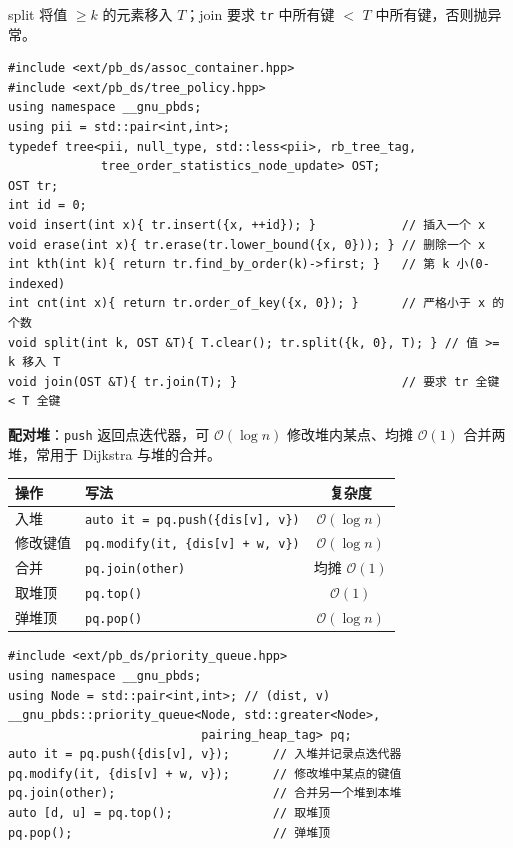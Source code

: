 split 将值 $\ge k$ 的元素移入 $T$；join 要求 \texttt{tr} 中所有键 $<$ $T$ 中所有键，否则抛异常。

\begin{lstlisting}
#include <ext/pb_ds/assoc_container.hpp>
#include <ext/pb_ds/tree_policy.hpp>
using namespace __gnu_pbds;
using pii = std::pair<int,int>;
typedef tree<pii, null_type, std::less<pii>, rb_tree_tag,
             tree_order_statistics_node_update> OST;
OST tr;
int id = 0;
void insert(int x){ tr.insert({x, ++id}); }            // 插入一个 x
void erase(int x){ tr.erase(tr.lower_bound({x, 0})); } // 删除一个 x
int kth(int k){ return tr.find_by_order(k)->first; }   // 第 k 小(0-indexed)
int cnt(int x){ return tr.order_of_key({x, 0}); }      // 严格小于 x 的个数
void split(int k, OST &T){ T.clear(); tr.split({k, 0}, T); } // 值 >= k 移入 T
void join(OST &T){ tr.join(T); }                       // 要求 tr 全键 < T 全键
\end{lstlisting}

\textbf{配对堆}：\texttt{push} 返回点迭代器，可 $\mathcal{O}(\log n)$ 修改堆内某点、均摊 $\mathcal{O}(1)$ 合并两堆，常用于 Dijkstra 与堆的合并。

\begin{center}
\small
\begin{tabular}{lp{7cm}c}
\toprule
操作 & 写法 & 复杂度 \\
\midrule
入堆 & \texttt{auto it = pq.push(\{dis[v], v\})} & $\mathcal{O}(\log n)$ \\
修改键值 & \texttt{pq.modify(it, \{dis[v] + w, v\})} & $\mathcal{O}(\log n)$ \\
合并 & \texttt{pq.join(other)} & 均摊 $\mathcal{O}(1)$ \\
取堆顶 & \texttt{pq.top()} & $\mathcal{O}(1)$ \\
弹堆顶 & \texttt{pq.pop()} & $\mathcal{O}(\log n)$ \\
\bottomrule
\end{tabular}
\end{center}

\begin{lstlisting}
#include <ext/pb_ds/priority_queue.hpp>
using namespace __gnu_pbds;
using Node = std::pair<int,int>; // (dist, v)
__gnu_pbds::priority_queue<Node, std::greater<Node>,
                           pairing_heap_tag> pq;
auto it = pq.push({dis[v], v});      // 入堆并记录点迭代器
pq.modify(it, {dis[v] + w, v});      // 修改堆中某点的键值
pq.join(other);                      // 合并另一个堆到本堆
auto [d, u] = pq.top();              // 取堆顶
pq.pop();                            // 弹堆顶
\end{lstlisting}

